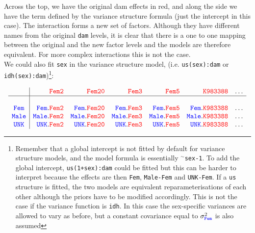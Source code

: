 \documentclass{article}
\begin{document}
Across the top, we have the original dam effects in red, and along the side we have the term defined by the variance structure formula (just the intercept in this case).  The interaction forms a new set of factors. Although they have different names from the original \texttt{dam} levels, it is clear that there is a one to one mapping between the original and the new factor levels and the models are therefore equivalent.  For more complex interactions this is not the case.\\

We could also fit \texttt{sex} in the variance structure model, (i.e. \texttt{us({\color{blue}sex}):{\color{red}dam}} or \texttt{idh({\color{blue}sex}):{\color{red}dam}})\footnote{Remember that a global intercept is not fitted by default for variance structure models, and the model formula is essentially $^{\sim}$\texttt{sex-1}. To add the global intercept, \texttt{us({\color{blue}1+sex}):{\color{red}dam}} could be fitted but this can be harder to interpret because the effects are then {\color{blue} \texttt{Fem}}, {\color{blue} \texttt{Male-Fem}} and {\color{blue} \texttt{UNK-Fem}}. If a \texttt{us} structure is fitted, the two models are equivalent reparameterisations of each other although the priors have to be modified accordingly. This is not the case if the variance function is \texttt{idh}. In this case the sex-specific variances are allowed to vary as before, but a constant covariance equal to $\sigma^{2}_{\color{blue} \texttt{Fem}}$ is also assumed}:

\begin{displaymath}
\begin{array}{c|rrrrrc}
&{\color{red} \texttt{Fem2}}&{\color{red} \texttt{Fem20}}&{\color{red} \texttt{Fem3}}&{\color{red} \texttt{Fem5}}&{\color{red} \texttt{K983388}}&\dots\\
\hline\\
{\color{blue} \texttt{Fem}}&{\color{blue} \texttt{Fem}}.{\color{red} \texttt{Fem2}}&{\color{blue} \texttt{Fem}}.{\color{red} \texttt{Fem20}}&{\color{blue} \texttt{Fem}}.{\color{red} \texttt{Fem3}}&{\color{blue} \texttt{Fem}}.{\color{red} \texttt{Fem5}}&{\color{blue} \texttt{Fem}}.{\color{red} \texttt{K983388}}&\dots\\
{\color{blue} \texttt{Male}}&{\color{blue} \texttt{Male}}.{\color{red} \texttt{Fem2}}&{\color{blue} \texttt{Male}}.{\color{red} \texttt{Fem20}}&{\color{blue} \texttt{Male}}.{\color{red} \texttt{Fem3}}&{\color{blue} \texttt{Male}}.{\color{red} \texttt{Fem5}}&{\color{blue} \texttt{Male}}.{\color{red} \texttt{K983388}}&\dots\\
{\color{blue} \texttt{UNK}}&{\color{blue} \texttt{UNK}}.{\color{red} \texttt{Fem2}}&{\color{blue} \texttt{UNK}}.{\color{red} \texttt{Fem20}}&{\color{blue} \texttt{UNK}}.{\color{red} \texttt{Fem3}}&{\color{blue} \texttt{UNK}}.{\color{red} \texttt{Fem5}}&{\color{blue} \texttt{UNK}}.{\color{red} \texttt{K983388}}&\dots\\
\end{array}
\end{displaymath}
\end{document}
